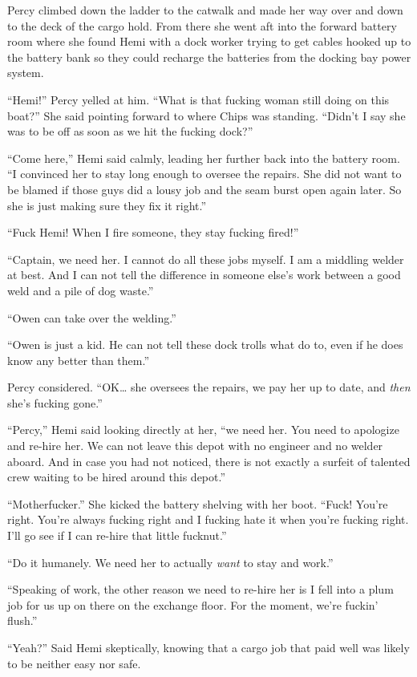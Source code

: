 \documentclass[
]{scrbook}
\begin{document}
Percy climbed down the ladder to the catwalk and made her way over and
down to the deck of the cargo hold. From there she went aft into the
forward battery room where she found Hemi with a dock worker trying to
get cables hooked up to the battery bank so they could recharge the
batteries from the docking bay power system.

``Hemi!'' Percy yelled at him. ``What is that fucking woman still doing
on this boat?'' She said pointing forward to where Chips was standing.
``Didn't I say she was to be off as soon as we hit the fucking dock?''

``Come here,'' Hemi said calmly, leading her further back into the
battery room. ``I convinced her to stay long enough to oversee the
repairs. She did not want to be blamed if those guys did a lousy job and
the seam burst open again later. So she is just making sure they fix it
right.''

``Fuck Hemi! When I fire someone, they stay fucking fired!''

``Captain, we need her. I cannot do all these jobs myself. I am a
middling welder at best. And I can not tell the difference in someone
else's work between a good weld and a pile of dog waste.''

``Owen can take over the welding.''

``Owen is just a kid. He can not tell these dock trolls what do to, even
if he does know any better than them.''

Percy considered. ``OK\ldots{} she oversees the repairs, we pay her up
to date, and \emph{then} she's fucking gone.''

``Percy,'' Hemi said looking directly at her, ``we need her. You need to
apologize and re-hire her. We can not leave this depot with no engineer
and no welder aboard. And in case you had not noticed, there is not
exactly a surfeit of talented crew waiting to be hired around this
depot.''

``Motherfucker.'' She kicked the battery shelving with her boot. ``Fuck!
You're right. You're always fucking right and I fucking hate it when
you're fucking right. I'll go see if I can re-hire that little
fucknut.''

``Do it humanely. We need her to actually \emph{want} to stay and
work.''

``Speaking of work, the other reason we need to re-hire her is I fell
into a plum job for us up on there on the exchange floor. For the
moment, we're fuckin' flush.''

``Yeah?'' Said Hemi skeptically, knowing that a cargo job that paid well
was likely to be neither easy nor safe.
\end{document}
